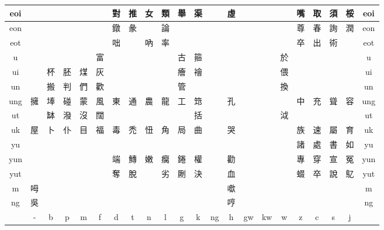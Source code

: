 \documentclass{article}
\begin{document}
\begin{adjustbox}{width=\textwidth, totalheight=\baselineskip,keepaspectratio}
\begin{tabular}{|>{\columncolor{mygray}}c|c|@{\hspace{1pt}}*{19}{c|@{\hspace{1pt}}} >{\columncolor{mygray}}c|}
	\hline
	eoi &  &  &  &  &  & 對 & 推 & 女 & 類 & 舉 & 渠 &  & 虛 &  &  &  & 嘴 & 取 & 須 & 桵 & eoi \\
	\hline
	eon &  &  &  &  &  & 鐓 & 彖 &  & 論 &  &  &  &  &  &  &  & 尊 & 春 & 詢 & 潤 & eon \\
	\hline
	eot &  &  &  &  &  & 咄 &  & 吶 & 率 &  &  &  &  &  &  &  & 卒 & 出 & 術 &  & eot \\
	\hline
	u &  &  &  &  & 富 &  &  &  &  & 古 & 箍 &  &  &  &  & 於 &  &  &  &  & u \\
	\hline
	ui &  & 杯 & 胚 & 煤 & 灰 &  &  &  &  & 癐 & 禬 &  &  &  &  & 偎 &  &  &  &  & ui \\
	\hline
	un &  & 搬 & 判 & 們 & 歡 &  &  &  &  & 管 &  &  &  &  &  & 換 &  &  &  &  & un \\
	\hline
	ung & 擁 & 埲 & 碰 & 蒙 & 風 & 東 & 通 & 農 & 龍 & 工 & 筇 &  & 孔 &  &  &  & 中 & 充 & 聳 & 容 & ung \\
	\hline
	ut &  & 缽 & 潑 & 沒 & 闊 &  &  &  &  &  & 括 &  &  &  &  & 泧 &  &  &  &  & ut \\
	\hline
	uk & 屋 & 卜 & 仆 & 目 & 福 & 毒 & 禿 & 忸 & 角 & 局 & 曲 &  & 哭 &  &  &  & 族 & 速 & 屬 & 育 & uk \\
	\hline
	yu &  &  &  &  &  &  &  &  &  &  &  &  &  &  &  &  & 諸 & 處 & 書 & 如 & yu \\
	\hline
	yun &  &  &  &  &  & 端 & 鱄 & 嫩 & 癵 & 錈 & 權 &  & 勸 &  &  &  & 專 & 穿 & 宣 & 冤 & yun \\
	\hline
	yut &  &  &  &  &  & 奪 & 脫 &  & 劣 & 劂 & 決 &  & 血 &  &  &  & 蝃 & 卒 & 說 & 鳦 & yut \\
	\hline
	m & 呣 &  &  &  &  &  &  &  &  &  &  &  & 噷 &  &  &  &  &  &  &  & m \\
	\hline
	ng & 吳 &  &  &  &  &  &  &  &  &  &  &  & 哼 &  &  &  &  &  &  &  & ng \\
	\hline
	\rowcolor{mygray} & - & b & p & m & f & d & t & n & l & g & k & ng & h & gw & kw & w & z & c & s & j &  \\
	\hline
\end{tabular}

\end{adjustbox}
\end{document}
